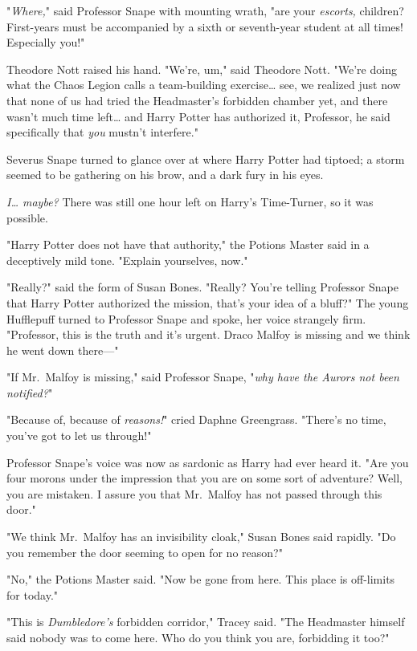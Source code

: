 "\emph{Where,}" said Professor Snape with mounting wrath, "are your 
\emph{escorts,} children? First-years must be accompanied by a sixth or 
seventh-year student at all times! Especially you!"

Theodore Nott raised his hand. "We're, um," said Theodore Nott. "We're doing 
what the Chaos Legion calls a team-building exercise{\ldots} see, we realized 
just now that none of us had tried the Headmaster's forbidden chamber yet, and 
there wasn't much time left{\ldots} and Harry Potter has authorized it, 
Professor, he said specifically that \emph{you} mustn't interfere."

Severus Snape turned to glance over at where Harry Potter had tiptoed; a storm 
seemed to be gathering on his brow, and a dark fury in his eyes.

\emph{I{\ldots} maybe?} There was still one hour left on Harry's Time-Turner, 
so it was possible.

"Harry Potter does not have that authority," the Potions Master said in a 
deceptively mild tone. "Explain yourselves, now."

"Really?" said the form of Susan Bones. "Really? You're telling Professor Snape 
that Harry Potter authorized the mission, that's your idea of a bluff?" The 
young Hufflepuff turned to Professor Snape and spoke, her voice strangely firm. 
"Professor, this is the truth and it's urgent. Draco Malfoy is missing and we 
think he went down there---"

"If Mr.~Malfoy is missing," said Professor Snape, "\emph{why have the Aurors 
not been notified?}"

"Because of, because of \emph{reasons!}" cried Daphne Greengrass. "There's no 
time, you've got to let us through!"

Professor Snape's voice was now as sardonic as Harry had ever heard it. "Are 
you four morons under the impression that you are on some sort of adventure? 
Well, you are mistaken. I assure you that Mr.~Malfoy has not passed through 
this door."

"We think Mr.~Malfoy has an invisibility cloak," Susan Bones said rapidly. "Do 
you remember the door seeming to open for no reason?"

"No," the Potions Master said. "Now be gone from here. This place is off-limits 
for today."

"This is \emph{Dumbledore's} forbidden corridor," Tracey said. "The Headmaster 
himself said nobody was to come here. Who do you think you are, forbidding it 
too?"


